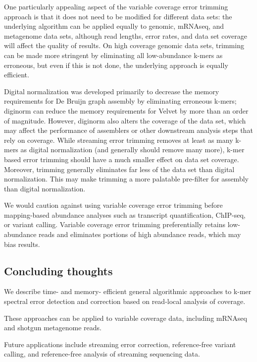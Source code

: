 \documentclass{article}
\begin{document}
One particularly appealing aspect of the variable coverage error
trimming approach is that it does not need to be modified for
different data sets: the underlying algorithm can be applied equally
to genomic, mRNAseq, and metagenome data sets, although read lengths,
error rates, and data set coverage will affect the quality of results.
On high coverage genomic data sets, trimming can be made more
stringent by eliminating all low-abundance k-mers as erroneous, but
even if this is not done, the underlying approach is equally
efficient.

Digital normalization was developed primarily to decrease the memory
requirements for De Bruijn graph assembly by eliminating erroneous
k-mers; diginorm can reduce the memory requirements for Velvet by more
than an order of magnitude.  However, diginorm also alters the
coverage of the data set, which may affect the performance of
assemblers or other downstream analysis steps that rely on coverage.
While streaming error trimming removes at least as many k-mers as
digital normalization (and generally should remove many more), k-mer
based error trimming should have a much smaller effect on data set
coverage.  Moreover, trimming generally eliminates far less of the
data set than digital normalization.  This may make trimming a more
palatable pre-filter for assembly than digital normalization.

We would caution against using variable coverage error trimming before
mapping-based abundance analyses such as transcript quantification,
ChIP-seq, or variant calling.  Variable coverage error trimming
preferentially retains low-abundance reads and eliminates portions of
high abundance reads, which may bias results.

\subsection{Concluding thoughts}

We describe time- and memory- efficient general algorithmic approaches
to k-mer spectral error detection and correction based on read-local
analysis of coverage.

These approaches can be applied to variable coverage data, including
mRNAseq and shotgun metagenome reads.

Future applications include streaming error correction, reference-free
variant calling, and reference-free analysis of streaming sequencing
data.
\end{document}
